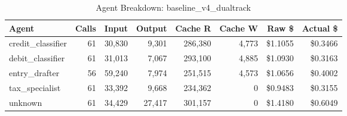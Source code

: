 \begin{table}[htbp]
\centering
\caption{Agent Breakdown: baseline\_v4\_dualtrack}
\label{tab:agent-baseline-v4-dualtrack}
\begin{tabular}{l r rr rr rr}
\toprule
Agent & Calls & Input & Output & Cache R & Cache W & Raw \$ & Actual \$ \\
\midrule
  credit\_classifier & 61 & 30,830 & 9,301 & 286,380 & 4,773 & \$1.1055 & \$0.3466 \\
  debit\_classifier & 61 & 31,013 & 7,067 & 293,100 & 4,885 & \$1.0930 & \$0.3163 \\
  entry\_drafter & 56 & 59,240 & 7,974 & 251,515 & 4,573 & \$1.0656 & \$0.4002 \\
  tax\_specialist & 61 & 33,392 & 9,668 & 234,362 & 0 & \$0.9483 & \$0.3155 \\
  unknown & 61 & 34,429 & 27,417 & 301,157 & 0 & \$1.4180 & \$0.6049 \\
\bottomrule
\end{tabular}
\end{table}
